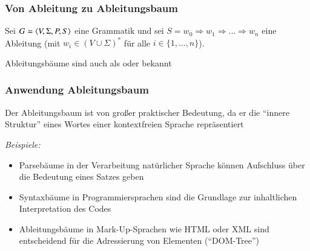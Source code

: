 \documentclass[aspectratio=1610,onlymath]{beamer}
\begin{document}
\begin{frame}\frametitle{Von Ableitung zu Ableitungsbaum}

Sei $G=\langle{V,\Sigma,P,S}\rangle$ eine Grammatik
und sei $S=w_0\Rightarrow\allowbreak w_1 \Rightarrow\allowbreak \ldots \allowbreak\Rightarrow w_n$ eine Ableitung
(mit $w_i\in (V\cup\Sigma)^*$ für alle $i\in\{1,\ldots,n\}$).
\bigskip

% 

Ableitungsbäume sind auch als  oder  bekannt

\end{frame}

\begin{frame}\frametitle{Anwendung Ableitungsbaum}

Der Ableitungsbaum ist von großer praktischer Bedeutung, 
da er die \alert{"`innere Struktur"'} eines Wortes einer kontextfreien Sprache
repräsentiert
\bigskip

{}%
\bigskip

\emph{Beispiele:}
\begin{itemize}
\item Parsebäume in der \alert{Verarbeitung natürlicher Sprache} können Aufschluss über die Bedeutung eines Satzes geben
\item Syntaxbäume in \alert{Programmiersprachen} sind die Grundlage zur inhaltlichen Interpretation des Codes
\item Ableitungsbäume in \alert{Mark-Up-Sprachen} wie HTML oder XML sind entscheidend für die Adressierung von Elementen ("`DOM-Tree"')
\end{itemize}

\end{frame}
\end{document}
